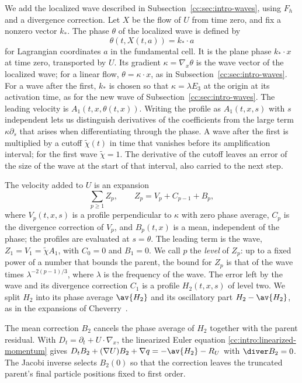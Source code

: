 We add the localized wave described in Subsection~\ref{cc:sec:intro-waves},
using $F_h$ and a divergence correction. Let $X$ be the flow of $U$ from
time zero, and fix a nonzero vector $k_*$. The phase $\theta$ of the
localized wave is defined by
\[
 \theta(t,X(t,a))=k_*\cdot a
\]
for Lagrangian coordinates $a$ in the fundamental cell. It is the plane
phase $k_*\cdot x$ at time zero, transported by $U$. Its gradient
$\kappa=\nabla_x\theta$ is the wave vector of the localized wave; for a
linear flow, $\theta=\kappa\cdot x$, as in
Subsection~\ref{cc:sec:intro-waves}. For a wave after the first, $k_*$
is chosen so that $\kappa=\lambda E_3$ at the origin at its activation
time, as for the new wave of Subsection~\ref{cc:sec:intro-waves}.
The leading velocity is $A_1(t,x,\theta(t,x))$. Writing the profile as
$A_1(t,x,s)$ with $s$ independent lets us distinguish derivatives of
the coefficients from the large term $\kappa\partial_s$ that arises
when differentiating through the phase.
A wave after the first is multiplied
by a cutoff $\widetilde\chi(t)$ in time that vanishes before its
amplification interval; for the first wave $\widetilde\chi=1$.
The derivative of the cutoff leaves an error of the size of the wave at
the start of that interval, also carried to the next step.

The velocity added to $U$ is an expansion
\[
 \sum_{p\ge1}Z_p,\qquad Z_p=V_p+C_{p-1}+B_p,
\]
where $V_p(t,x,s)$ is a profile perpendicular to $\kappa$ with zero
phase average, $C_p$ is the divergence correction of $V_p$, and
$B_p(t,x)$ is a mean, independent of the phase; the profiles are
evaluated at $s=\theta$. The leading term is the wave,
$Z_1=V_1=\widetilde\chi A_1$, with $C_0=0$ and $B_1=0$. We call $p$ the
\emph{level} of $Z_p$: up to a fixed power of a number that bounds the
parent, the bound for $Z_p$ is that of the wave times
$\lambda^{-2(p-1)/3}$, where $\lambda$ is the frequency of the wave.
The error left by the wave and its divergence correction $C_1$ is a
profile $H_2(t,x,s)$ of level two.
We split $H_2$ into its phase average $\av{H_2}$ and its
oscillatory part $H_2-\av{H_2}$, as in the expansions of
Cheverry~\cite[Section~4.1]{Cheverry2006}.

The mean correction $B_2$ cancels the phase average of $H_2$ together
with the parent residual. With $D_t=\partial_t+U\cdot\nabla_x$, the
linearized Euler equation \eqref{cc:intro:linearized-momentum} gives
$D_t B_2+(\nabla U)B_2+\nabla q=-\av{H_2}-R_U$ with
$\diver B_2=0$. The Jacobi inverse selects $B_2(0)$ so that the
correction leaves the truncated parent's final particle positions fixed
to first order.

